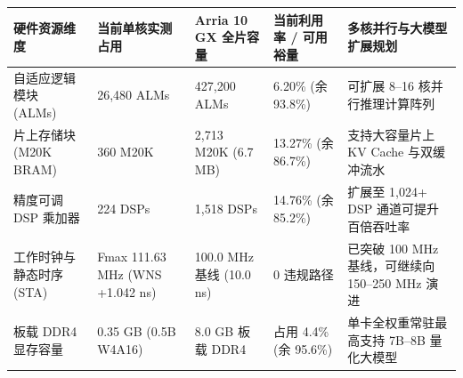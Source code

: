 \documentclass[11pt,a4paper]{article}
\begin{document}
{\footnotesize\renewcommand{\arraystretch}{1.14}\begin{longtable}{@{}L{0.19\textwidth}L{0.16\textwidth}L{0.16\textwidth}L{0.15\textwidth}L{0.24\textwidth}@{}}\toprule

\textbf{硬件资源维度} & \textbf{当前单核实测占用} & \textbf{Arria 10 GX 全片容量} & \textbf{当前利用率 /\allowbreak{} 可用裕量} & \textbf{多核并行与大模型扩展规划}\\\midrule\endhead

自适应逻辑模块 (\allowbreak{}ALMs)\allowbreak{} & 26,\allowbreak{}480 ALMs & 427,\allowbreak{}200 ALMs & 6.20\% (\allowbreak{}余 93.8\%)\allowbreak{} & 可扩展 8–16 核并行推理计算阵列\\[2pt]

片上存储块 (\allowbreak{}M20K BRAM)\allowbreak{} & 360 M20K & 2,\allowbreak{}713 M20K (\allowbreak{}6.7 MB)\allowbreak{} & 13.27\% (\allowbreak{}余 86.7\%)\allowbreak{} & 支持大容量片上 KV Cache 与双缓冲流水\\[2pt]

精度可调 DSP 乘加器 & 224 DSPs & 1,\allowbreak{}518 DSPs & 14.76\% (\allowbreak{}余 85.2\%)\allowbreak{} & 扩展至 1,\allowbreak{}024+\allowbreak{} DSP 通道可提升百倍吞吐率\\[2pt]

工作时钟与静态时序 (\allowbreak{}STA)\allowbreak{} & Fmax 111.63 MHz (\allowbreak{}WNS +\allowbreak{}1.042 ns)\allowbreak{} & 100.0 MHz 基线 (\allowbreak{}10.0 ns)\allowbreak{} & 0 违规路径 & 已突破 100 MHz 基线，可继续向 150–250 MHz 演进\\[2pt]

板载 DDR4 显存容量 & 0.35 GB (\allowbreak{}0.5B W4A16)\allowbreak{} & 8.0 GB 板载 DDR4 & 占用 4.4\% (\allowbreak{}余 95.6\%)\allowbreak{} & 单卡全权重常驻最高支持 7B–8B 量化大模型\\[2pt]

\bottomrule\end{longtable}}
\end{document}
